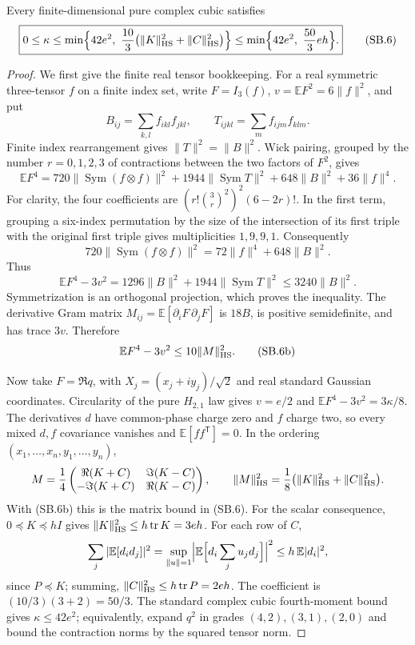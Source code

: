 \begin{lemma}
\label{thm:cc-matrix}
Every finite-dimensional pure complex cubic satisfies
\[
 \boxed{0\le\kappa\le
 \min\Bigl\{42e^2,\ \frac{10}3\bigl(\|K\|_{\rm HS}^2+\|C\|_{\rm HS}^2\bigr)\Bigr\}
 \le\min\Bigl\{42e^2,\ \frac{50}3eh\Bigr\}.} \tag{SB.6}
\]
\end{lemma}
\begin{proof}
We first give the finite real tensor bookkeeping.
For a real symmetric three-tensor \(f\) on a finite index set, write
\(F=I_3(f)\), \(v=\mathbb EF^2=6\|f\|^2\), and put
\[
 B_{ij}=\sum_{k,l}f_{ikl}f_{jkl},\qquad
 T_{ijkl}=\sum_m f_{ijm}f_{klm}.
\]
Finite index rearrangement gives \(\|T\|^2=\|B\|^2\).
Wick pairing, grouped by the number \(r=0,1,2,3\) of contractions
between the two factors of \(F^2\), gives
\[
 \mathbb EF^4
 =720\|\operatorname{Sym}(f\otimes f)\|^2
   +1944\|\operatorname{Sym}T\|^2+648\|B\|^2+36\|f\|^4.
\]
For clarity, the four coefficients are
\((r!\binom3r^2)^2(6-2r)!\).
In the first term, grouping a six-index permutation by the size of
the intersection of its first triple with the original first triple
gives multiplicities \(1,9,9,1\). Consequently
\[
 720\|\operatorname{Sym}(f\otimes f)\|^2
       =72\|f\|^4+648\|B\|^2.
\]
Thus
\[
 \mathbb EF^4-3v^2
 =1296\|B\|^2+1944\|\operatorname{Sym}T\|^2
 \le3240\|B\|^2.
\]
Symmetrization is an orthogonal projection, which proves the inequality.
The derivative Gram matrix \(M_{ij}=\mathbb E[\partial_iF\,\partial_jF]\)
is \(18B\), is positive semidefinite, and has trace \(3v\).
Therefore
\[
 \mathbb EF^4-3v^2\le10\|M\|_{\rm HS}^2. \tag{SB.6b}
\]

Now take \(F=\Re q\), with \(X_j=(x_j+iy_j)/\sqrt2\) and real
standard Gaussian coordinates. Circularity of the pure \(H_{2,1}\)
law gives \(v=e/2\) and
\(\mathbb EF^4-3v^2=3\kappa/8\).
The derivatives \(d\) have common-phase charge zero and \(f\) charge two,
so every mixed \(d,f\) covariance vanishes and
\(\mathbb E[ff^{\mathsf T}]=0\). In the ordering
\((x_1,\dots,x_n,y_1,\dots,y_n)\),
\[
 M=\frac14\begin{pmatrix}
 \Re(K+C)&\Im(K-C)\\
 -\Im(K+C)&\Re(K-C)
 \end{pmatrix},\qquad
 \|M\|_{\rm HS}^2=\frac18\bigl(\|K\|_{\rm HS}^2+\|C\|_{\rm HS}^2\bigr).
\]
With (SB.6b) this is the matrix bound in (SB.6).
For the scalar consequence, \(0\preceq K\preceq hI\) gives
\(\|K\|_{\rm HS}^2\le h\operatorname{tr}K=3eh\). For each row of \(C\),
\[
 \sum_j|\mathbb E[d_id_j]|^2
 =\sup_{\|u\|=1}\Bigl|\mathbb E\Bigl[d_i\sum_ju_jd_j\Bigr]\Bigr|^2
 \le h\,\mathbb E|d_i|^2,
\]
since \(P\preceq K\); summing, \(\|C\|_{\rm HS}^2\le h\operatorname{tr}P=2eh\).
The coefficient is \((10/3)(3+2)=50/3\).
The standard complex cubic fourth-moment bound gives \(\kappa\le42e^2\);
equivalently, expand \(q^2\) in grades \((4,2),(3,1),(2,0)\)
and bound the contraction norms by the squared tensor norm.
\end{proof}

